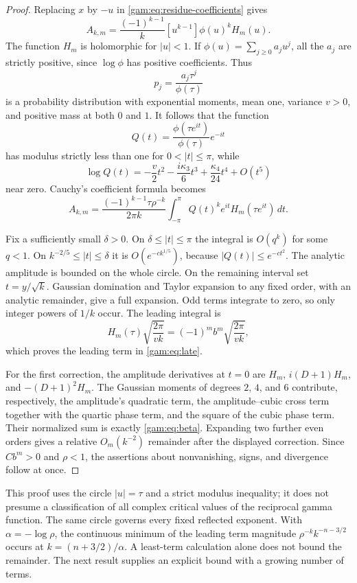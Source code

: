 \begin{proof}
Replacing $x$ by $-u$ in \eqref{gam:eq:residue-coefficients} gives
\[
 A_{k,m}=\frac{(-1)^{k-1}}k[u^{k-1}]\phi(u)^k H_m(u).
\]
The function $H_m$ is holomorphic for $|u|<1$.  If
$\phi(u)=\sum_{j\ge0}a_ju^j$, all the $a_j$ are strictly positive,
since $\log\phi$ has positive coefficients.  Thus
\[
 p_j=\frac{a_j\tau^j}{\phi(\tau)}
\]
is a probability distribution with exponential moments, mean one,
variance $v>0$, and positive mass at both $0$ and $1$.  It follows
that the function
\[
 Q(t)=\frac{\phi(\tau e^{it})}{\phi(\tau)}e^{-it}
\]
has modulus strictly less than one for $0<|t|\le\pi$, while
\[
 \log Q(t)=-\frac v2t^2-\frac{i\kappa_3}6t^3
 +\frac{\kappa_4}{24}t^4+O(t^5)
\]
near zero.  Cauchy's coefficient formula becomes
\begin{equation}\label{gam:eq:cauchy}
 A_{k,m}=
 \frac{(-1)^{k-1}\tau\rho^{-k}}{2\pi k}
 \int_{-\pi}^{\pi}Q(t)^k e^{it}H_m(\tau e^{it})\,dt.
\end{equation}

Fix a sufficiently small $\delta>0$.  On $\delta\le|t|\le\pi$
the integral is $O(q^k)$ for some $q<1$.  On
$k^{-2/5}\le|t|\le\delta$ it is $O(e^{-c k^{1/5}})$, because
$|Q(t)|\le e^{-ct^2}$.  The analytic amplitude is bounded on the
whole circle.  On the remaining interval set $t=y/\sqrt{k}$.
Gaussian domination and Taylor expansion to any fixed order, with
an analytic remainder, give a full expansion.  Odd terms integrate
to zero, so only integer powers of $1/k$ occur.  The leading integral is
\[
 H_m(\tau)\sqrt{\frac{2\pi}{vk}}
 =(-1)^m b^m\sqrt{\frac{2\pi}{vk}},
\]
which proves the leading term in \eqref{gam:eq:late}.

For the first correction, the amplitude derivatives at $t=0$ are
$H_m$, $i(D+1)H_m$, and $-(D+1)^2H_m$.
The Gaussian moments of degrees $2$, $4$, and $6$ contribute,
respectively, the amplitude's quadratic term, the amplitude--cubic
cross term together with the quartic phase term, and the square of
the cubic phase term.  Their normalized sum is exactly
\eqref{gam:eq:beta}.  Expanding two further even orders gives a
relative $O_m(k^{-2})$ remainder after the displayed correction.
Since $C b^m>0$ and $\rho<1$, the assertions about nonvanishing,
signs, and divergence follow at once.
\end{proof}

This proof uses the circle $|u|=\tau$ and a strict modulus inequality;
it does not presume a classification of all complex critical values
of the reciprocal gamma function.  The same circle governs every fixed
reflected exponent.  With $\alpha=-\log\rho$, the continuous minimum
of the leading term magnitude $\rho^{-k}k^{-n-3/2}$ occurs at
$k=(n+3/2)/\alpha$.  A least-term calculation alone does not bound the
remainder.  The next result supplies an explicit bound with a growing
number of terms.

